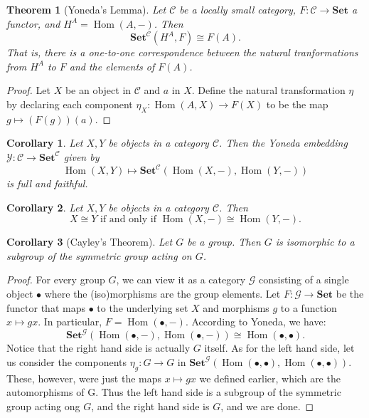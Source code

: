 \documentclass[12pt]{book}
\theoremstyle{definition}
\theoremstyle{plain}
\newtheorem{theorem}[definition]{Theorem}
\newtheorem{corollary}{Corollary}[definition]
\theoremstyle{definition}
\DeclareMathOperator{\Hom}{Hom}
\begin{document}
\begin{theorem}[Yoneda's Lemma]
  Let $\mathscr{C}$ be a locally small category, $F : \mathscr{C} \rightarrow \mathbf{Set}$ a functor, and $H^A = \Hom(A, -)$. Then
  \[\mathbf{Set}^\mathscr{C}(H^A, F) \cong F(A).\]
  That is, there is a one-to-one correspondence between the natural tranformations from $H^A$ to $F$ and the elements of $F(A)$.
\end{theorem}

\begin{proof}
  Let $X$ be an object in $\mathscr{C}$ and $a$ in $X$. Define the natural transformation $\eta$ by declaring each component $\eta_X : \Hom(A, X) \rightarrow F(X)$ to be the map $g \mapsto (F(g))(a)$.
\end{proof}

\begin{corollary}
  Let $X, Y$ be objects in a category $\mathscr{C}$. Then the Yoneda embedding $\mathscr{Y} : \mathscr{C} \rightarrow \mathbf{Set}^\mathscr{C}$ given by \[\Hom(X, Y) \mapsto \mathbf{Set}^\mathscr{C}(\Hom(X, -), \Hom(Y, -))\] is full and faithful.
\end{corollary}

\begin{corollary}
  Let $X, Y$ be objects in a category $\mathscr{C}$. Then 
  \[X \cong Y \text{ if and only if } \Hom(X, -) \cong \Hom(Y, -).\]
\end{corollary}

\begin{corollary}[Cayley's Theorem]
  Let $G$ be a group. Then $G$ is isomorphic to a subgroup of the symmetric group acting on $G$.
\end{corollary}

\begin{proof}
  For every group $G$, we can view it as a category $\mathscr{G}$ consisting of a single object $\bullet$ where the (iso)morphisms are the group elements. Let $F: \mathscr{G} \rightarrow \mathbf{Set}$ be the functor that maps $\bullet$ to the underlying set $X$ and morphisms $g$ to a function $x \mapsto gx$. In particular, $F = \Hom(\bullet, -)$. According to Yoneda, we have:
  \[\mathbf{Set}^\mathscr{G}(\Hom(\bullet, -), \Hom(\bullet, -)) \cong \Hom(\bullet, \bullet).\]
  Notice that the right hand side is actually $G$ itself. As for the left hand side, let us consider the components $\eta_g : G \rightarrow G$ in $\mathbf{Set}^\mathscr{G}(\Hom(\bullet, \bullet), \Hom(\bullet, \bullet))$. These, however, were just the maps $x \mapsto gx$ we defined earlier, which are the automorphisms of G. Thus the left hand side is a subgroup of the symmetric group acting ong $G$, and the right hand side is $G$, and we are done.
\end{proof}
\end{document}
